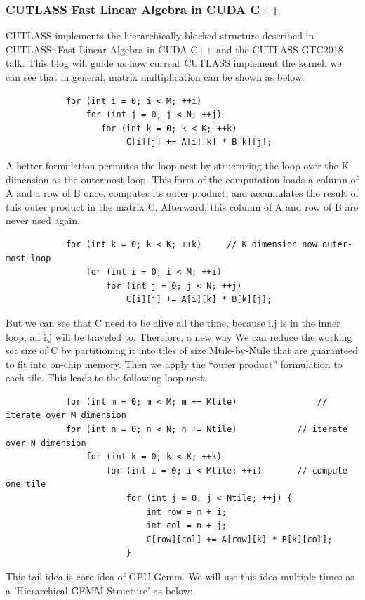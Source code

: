 \documentclass[8pt,UTF8]{article}
\begin{document}
        \subsubsection{\href{https://developer.nvidia.com/blog/cutlass-linear-algebra-cuda/}{CUTLASS Fast Linear Algebra in CUDA C++}}
            CUTLASS implements the hierarchically blocked structure described in CUTLASS: Fast Linear Algebra in CUDA C++ and the CUTLASS GTC2018 talk. This blog will guide us how current CUTLASS implement the kernel.
            \newline we can see that in general, matrix multiplication can be shown as below:
            \begin{lstlisting}
            for (int i = 0; i < M; ++i)
                for (int j = 0; j < N; ++j)
                   for (int k = 0; k < K; ++k) 
                        C[i][j] += A[i][k] * B[k][j];
            \end{lstlisting}
            A better formulation permutes the loop nest by structuring the loop over the K dimension as the outermost loop. This form of the computation loads a column of A and a row of B once, computes its outer product, and accumulates the result of this outer product in the matrix C. Afterward, this column of A and row of B are never used again.
            \begin{lstlisting}
            for (int k = 0; k < K; ++k)     // K dimension now outer-most loop
                for (int i = 0; i < M; ++i)
                    for (int j = 0; j < N; ++j)
                        C[i][j] += A[i][k] * B[k][j];
            \end{lstlisting}
            But we can see that C need to be alive all the time, because i,j is in the inner loop, all i,j will be traveled to. Therefore, a new way  We can reduce the working set size of C by partitioning it into tiles of size Mtile-by-Ntile that are guaranteed to fit into on-chip memory. Then we apply the “outer product” formulation to each tile. This leads to the following loop nest.
            \begin{lstlisting}
            for (int m = 0; m < M; m += Mtile)                // iterate over M dimension
            for (int n = 0; n < N; n += Ntile)            // iterate over N dimension
                for (int k = 0; k < K; ++k)
                    for (int i = 0; i < Mtile; ++i)       // compute one tile 
                        for (int j = 0; j < Ntile; ++j) {
                            int row = m + i;
                            int col = n + j;
                            C[row][col] += A[row][k] * B[k][col];
                        }
            \end{lstlisting}
            This tail idea is core idea of GPU Gemm. We will use this idea multiple times as a 'Hierarchical GEMM Structure' as below:
            
\end{document}
